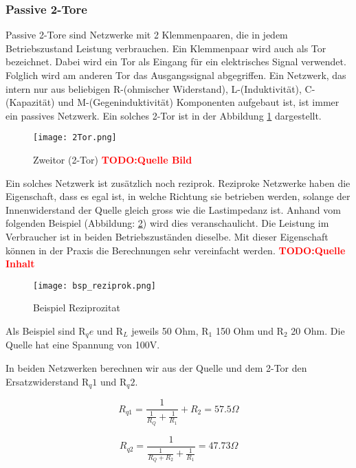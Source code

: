  \subsubsection{Passive 2-Tore} \label{subsubsec:2tore}
  
Passive 2-Tore sind Netzwerke mit 2 Klemmenpaaren, die in jedem Betriebszustand Leistung verbrauchen. Ein Klemmenpaar wird auch als Tor bezeichnet. Dabei wird ein Tor als Eingang für ein elektrisches Signal verwendet. Folglich wird am anderen Tor das Ausgangssignal abgegriffen. Ein Netzwerk, das intern nur aus beliebigen R-(ohmischer Widerstand), L-(Induktivität), C-(Kapazität) und M-(Gegeninduktivität) Komponenten aufgebaut ist, ist immer ein passives Netzwerk. Ein solches 2-Tor ist in der Abbildung \ref{fig:2tor} dargestellt.

\begin{figure}[H]
	\centering
	\texttt{[image: 2Tor.png]}
	\caption{Zweitor (2-Tor) \textcolor{red}{\textbf{TODO:Quelle Bild}} }
	\label{fig:2tor}
\end{figure}

Ein solches Netzwerk ist zusätzlich noch reziprok. Reziproke Netzwerke haben die Eigenschaft, dass es egal ist, in welche Richtung sie betrieben werden, solange der Innenwiderstand der Quelle gleich gross wie die Lastimpedanz ist. Anhand vom folgenden Beispiel (Abbildung: \ref{fig:reziprozitat}) wird dies veranschaulicht. Die Leistung im Verbraucher ist in beiden Betriebszuständen dieselbe. Mit dieser Eigenschaft können in der  Praxis die Berechnungen sehr vereinfacht werden. \textcolor{red}{\textbf{TODO:Quelle Inhalt}}

\begin{figure}[H]
	\centering
	\texttt{[image: bsp\_reziprok.png]}
	\caption{Beispiel Reziprozitat}
	\label{fig:reziprozitat}
\end{figure}


Als Beispiel sind R$_qe$ und R$_L$ jeweils 50 Ohm, R$_1$ 150 Ohm und R$_2$ 20 Ohm. Die Quelle hat eine Spannung von 100V.

In beiden Netzwerken berechnen wir aus der Quelle und dem 2-Tor den Ersatzwiderstand  R$_q1$ und R$_q2$.


\begin{equation}\label{equ:rqe1}
			R_{q1} = \frac{1}{\frac{1}{R_Q}+\frac{1}{R_1}} +R_2 =  57.5 \Omega 
		\end{equation}

\begin{equation}\label{equ:rqe1}
			R_{q2} = \frac{1}{\frac{1}{R_Q+R_2}+\frac{1}{R_1}} =  47.73 \Omega 
		\end{equation}
	
